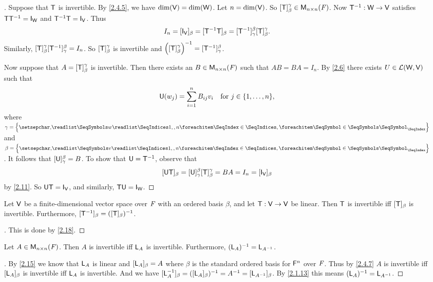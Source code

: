\begin{proof}[]
  Suppose that \(\mathsf{T}\) is invertible.
  By \cref{2.4.5}, we have \(\dim(\mathsf{V}) = \dim(\mathsf{W})\).
  Let \(n = \dim(\mathsf{V})\).
  So \([\mathsf{T}]_{\beta}^{\gamma} \in \mathsf{M}_{{n} \times n}({\mathit{F}})\).
  Now \(\mathsf{T}^{-1} : \mathsf{W} \to \mathsf{V}\) satisfies \(\T \T^{-1} = \IT[\W]\) and \(\T^{-1} \T = \IT[\V]\).
  Thus
  \[
    I_n = [\IT[\V]]_{\beta} = [\T^{-1} \T]_{\beta} = [\T^{-1}]_{\gamma}^{\beta} [\T]_{\beta}^{\gamma}.
  \]
  Similarly, \([\mathsf{T}]_{\beta}^{\gamma} [\mathsf{T}^{-1}]_{\gamma}^{\beta} = I_n\).
  So \([\mathsf{T}]_{\beta}^{\gamma}\) is invertible and \(\left\lparen[\mathsf{T}]_{\beta}^{\gamma}\right\rparen^{-1} = [\mathsf{T}^{-1}]_{\gamma}^{\beta}\).

  Now suppose that \(A = [\mathsf{T}]_{\beta}^{\gamma}\) is invertible.
  Then there exists an \(B \in \mathsf{M}_{{n} \times n}({\mathit{F}})\) such that \(AB = BA = I_n\).
  By \cref{2.6} there exists \(U \in \mathcal{L}(\mathsf{W}, \mathsf{V})\) such that
  \[
    \U(w_j) = \sum_{i = 1}^n B_{i j} v_i \quad \text{for } j \in \set{1, \dots, n},
  \]
  where \(\gamma = \set{\seq{w}{1,,n}}\) and \(\beta = \set{\seq{v}{1,,n}}\).
  It follows that \([\mathsf{U}]_{\gamma}^{\beta} = B\).
  To show that \(\mathsf{U} = \mathsf{T}^{-1}\), observe that
  \[
    [\U \T]_{\beta} = [\U]_{\gamma}^{\beta} [\T]_{\beta}^{\gamma} = BA = I_n = [\IT[\V]]_{\beta}
  \]
  by \cref{2.11}.
  So \(\U \T = \IT[\V]\), and similarly, \(\T \U = \IT[\W]\).
\end{proof}

\begin{cor}\label{2.4.6}
  Let \(\mathsf{V}\) be a finite-dimensional vector space over \(\mathit{F}\) with an ordered basis \(\beta\), and let \(\mathsf{T} : \mathsf{V} \to \mathsf{V}\) be linear.
  Then \(\mathsf{T}\) is invertible iff \([\mathsf{T}]_{\beta}\) is invertible.
  Furthermore, \([\mathsf{T}^{-1}]_{\beta} = ([\mathsf{T}]_{\beta})^{-1}\).
\end{cor}

\begin{proof}[]
  This is done by \cref{2.18}.
\end{proof}

\begin{cor}\label{2.4.7}
  Let \(A \in \mathsf{M}_{{n} \times n}({\mathit{F}})\).
  Then \(A\) is invertible iff \(\mathsf{L}_A\) is invertible.
  Furthermore, \((\mathsf{L}_A)^{-1} = \mathsf{L}_{A^{-1}}\).
\end{cor}

\begin{proof}[]
  By \cref{2.15} we know that \(\mathsf{L}_A\) is linear and \([\mathsf{L}_A]_{\beta} = A\) where \(\beta\) is the standard ordered basis for \(\mathsf{F}^n\) over \(\mathit{F}\).
  Thus by \cref{2.4.7} \(A\) is invertible iff \([\mathsf{L}_A]_{\beta}\) is invertible iff \(\mathsf{L}_A\) is invertible.
  And we have \([\mathsf{L}_A^{-1}]_{\beta} = ([\mathsf{L}_A]_{\beta})^{-1} = A^{-1} = [\mathsf{L}_{A^{-1}}]_{\beta}\).
  By \cref{2.1.13} this means \((\mathsf{L}_A)^{-1} = \mathsf{L}_{A^{-1}}\).
\end{proof}

